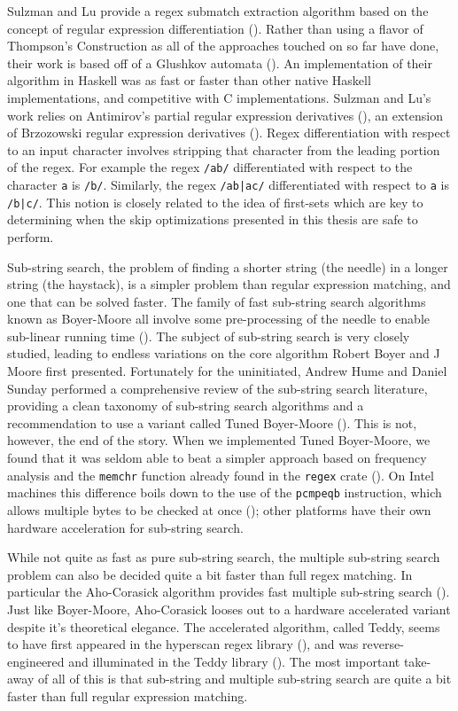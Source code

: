 Sulzman and Lu provide a regex submatch extraction algorithm
based on the concept of regular expression differentiation
(\cite{Sulzmann2012}). Rather than using a flavor of Thompson's
Construction as all of the approaches touched on so far have done,
their work is based off of a Glushkov automata (\cite{Allauzen2006}).
An implementation of their algorithm in Haskell was as fast or
faster than other native Haskell implementations, and competitive
with C implementations. Sulzman and Lu's work relies on
Antimirov's partial regular expression derivatives (\cite{Antimirov1996}),
an extension of Brzozowski regular expression derivatives
(\cite{Brzozowski1964}). Regex differentiation with respect
to an input character involves stripping that character from
the leading portion of the regex. For example the regex \verb'/ab/'
differentiated with respect to the character \verb'a' is \verb'/b/'.
Similarly, the regex \verb'/ab|ac/' differentiated with respect to
\verb'a' is \verb'/b|c/'. This notion is closely related to the
idea of first-sets which are key to determining when
the skip optimizations presented in this thesis are safe to perform.

Sub-string search, the problem of finding a shorter string (the needle) in
a longer string (the haystack), is a simpler problem than regular expression
matching, and one that can be solved faster. The family of fast sub-string
search algorithms known as Boyer-Moore all involve some pre-processing of
the needle to enable sub-linear running time (\cite{Boyer1977}).
The subject of sub-string search is very closely studied, leading to
endless variations on the core algorithm Robert Boyer and J Moore
first presented. Fortunately for the uninitiated, Andrew Hume and
Daniel Sunday performed a comprehensive review of the sub-string search
literature, providing a clean taxonomy of sub-string search algorithms
and a recommendation to use a variant called Tuned Boyer-Moore
(\cite{Hume1991}). This is not, however, the end of the story.
When we implemented Tuned Boyer-Moore, we found that it was seldom
able to beat a simpler approach based on frequency analysis and
the \verb'memchr' function already found in the \verb'regex' crate
(\cite{GallantRegex}). On Intel machines this difference boils down
to the use of the \verb'pcmpeqb' instruction, which allows multiple
bytes to be checked at once (\cite{IntelInstructionManual}); other
platforms have their own hardware acceleration for sub-string search. 

While not quite as fast as pure sub-string search, the multiple
sub-string search problem can also be decided quite a bit faster than
full regex matching. In particular the Aho-Corasick algorithm provides
fast multiple sub-string search (\cite{Aho1975}). Just like Boyer-Moore,
Aho-Corasick looses out to a hardware accelerated variant despite it's
theoretical elegance. The accelerated algorithm, called Teddy, seems
to have first appeared in the hyperscan regex library (\cite{hyperscan}),
and was reverse-engineered
and illuminated in the Teddy library (\cite{Teddy}). The most important
take-away of all of this is that sub-string and multiple sub-string
search are quite a bit faster than full regular expression matching.

